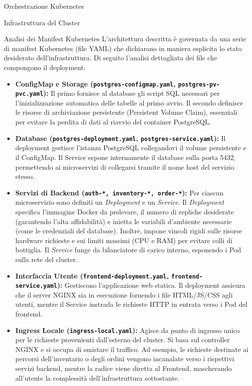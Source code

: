 \begin{mychapter}{Orchestrazione Kubernetes}
\begin{mysection}{Infrastruttura del Cluster}
\begin{mysubsection}{Analisi dei Manifest Kubernetes}
L'architettura descritta è governata da una serie di manifest Kubernetes (file YAML) che dichiarano in maniera esplicita lo stato desiderato dell'infrastruttura. Di seguito l'analisi dettagliata dei file che compongono il deployment:

\begin{itemize}
    \item \textbf{ConfigMap e Storage (\texttt{postgres-configmap.yaml}, \texttt{postgres-pv-pvc.yaml}):} Il primo fornisce al database gli script SQL necessari per l'inizializzazione automatica delle tabelle al primo avvio. Il secondo definisce le risorse di archiviazione persistente (Persistent Volume Claim), essenziali per evitare la perdita di dati al riavvio del container PostgreSQL.
    
    \item \textbf{Database (\texttt{postgres-deployment.yaml}, \texttt{postgres-service.yaml}):} Il deployment gestisce l'istanza PostgreSQL collegandovi il volume persistente e il ConfigMap. Il Service espone internamente il database sulla porta 5432, permettendo ai microservizi di collegarsi tramite il nome host del servizio stesso.
    
    \item \textbf{Servizi di Backend (\texttt{auth-*, inventory-*, order-*}):} Per ciascun microservizio sono definiti un \textit{Deployment} e un \textit{Service}. Il \textit{Deployment} specifica l'immagine Docker da prelevare, il numero di repliche desiderate (garantendo l'alta affidabilità) e inietta le variabili d'ambiente necessarie (come le credenziali del database). Inoltre, impone vincoli rigidi sulle risorse hardware richieste e sui limiti massimi (CPU e RAM) per evitare colli di bottiglia. Il \textit{Service} funge da bilanciatore di carico interno, esponendo i Pod sulla rete del cluster.
    
    \item \textbf{Interfaccia Utente (\texttt{frontend-deployment.yaml}, \texttt{frontend-service.yaml}):} Gestiscono l'applicazione web statica. Il deployment assicura che il server NGINX sia in esecuzione fornendo i file HTML/JS/CSS agli utenti, mentre il Service instrada le richieste HTTP in entrata verso i Pod del frontend.
    
    \item \textbf{Ingress Locale (\texttt{ingress-local.yaml}):} Agisce da punto di ingresso unico per le richieste provenienti dall'esterno del cluster. Si basa sul controller NGINX e si occupa di smistare il traffico. Ad esempio, le richieste destinate ai percorsi dell'inventario o degli ordini vengono incanalate verso i rispettivi servizi backend, mentre la radice viene diretta al Frontend, mascherando all'utente la complessità dell'infrastruttura sottostante.
\end{itemize}
\end{mysubsection}


\end{mysection}
\end{mychapter}
